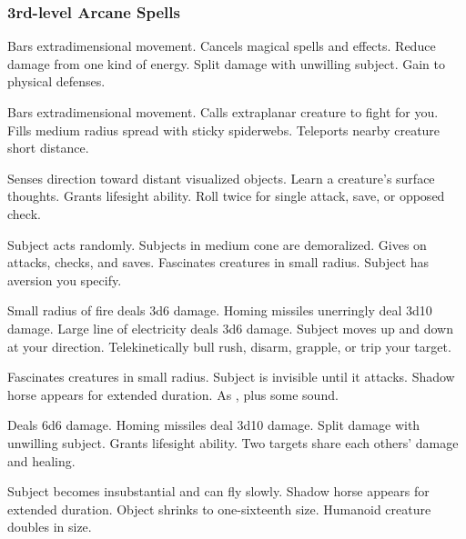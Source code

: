\subsubsection{3rd-level Arcane Spells} 
\begin{swspelllist}
   Bars extradimensional movement.
   Cancels magical spells and effects.
   Reduce damage from one kind of energy.
   Split damage with unwilling subject.
   Gain  to physical defenses.

   Bars extradimensional movement.
   Calls extraplanar creature to fight for you.
   Fills medium radius spread with sticky spiderwebs.
   Teleports nearby creature short distance.

   Senses direction toward distant visualized objects.
   Learn a creature's surface thoughts.
   Grants lifesight ability.
   Roll twice for single attack, save, or opposed check.

   Subject acts randomly.
   Subjects in medium cone are demoralized.
   Gives  on attacks, checks, and saves.
   Fascinates creatures in small radius.
   Subject has aversion you specify.

   Small radius of fire deals 3d6 damage.
   Homing missiles unerringly deal 3d10 damage.
   Large line of electricity deals 3d6 damage.
   Subject moves up and down at your direction.
   Telekinetically bull rush, disarm, grapple, or trip your target.

   Fascinates creatures in small radius.
   Subject is invisible until it attacks.
   Shadow horse appears for extended duration.
   As , plus some sound.

   Deals 6d6 damage.
   Homing missiles deal 3d10 damage.
   Split damage with unwilling subject.
   Grants lifesight ability.
   Two targets share each others' damage and healing.

   Subject becomes insubstantial and can fly slowly.
   Shadow horse appears for extended duration.
   Object shrinks to one-sixteenth size.
   Humanoid creature doubles in size.
\end{swspelllist}

